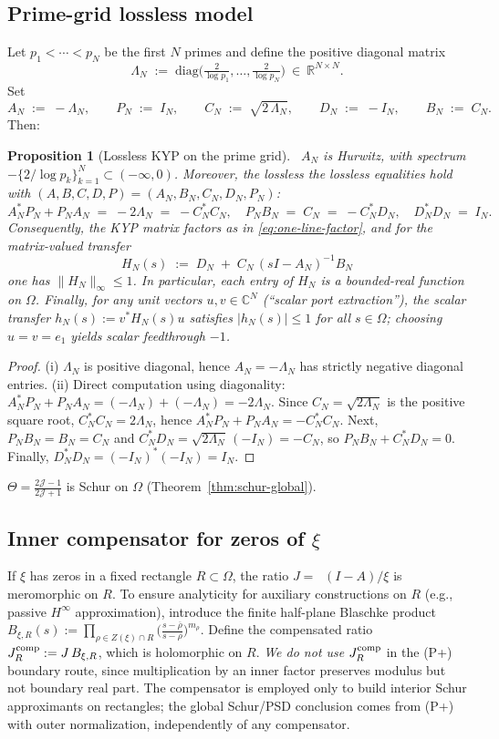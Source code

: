 \documentclass[11pt]{article}
\newtheorem{proposition}[theorem]{Proposition}
\theoremstyle{definition}
\theoremstyle{remark}
\newcommand{\C}{\mathbb{C}}
\newcommand{\R}{\mathbb{R}}
\DeclareMathOperator{\dettwo}{det_2}
\begin{document}
\subsection{Prime-grid lossless model}\label{subsec:prime-grid-KYP}
Let \(p_1<\cdots<p_N\) be the first \(N\) primes and define the positive diagonal matrix
\[
 \Lambda_N\;:=\;\mathrm{diag}\!\Big(\tfrac{2}{\log p_1},\dots,\tfrac{2}{\log p_N}\Big)\ \in\ \R^{N\times N}.
\]
Set
\[
 A_N\;:=\;-\Lambda_N,\qquad P_N\;:=\;I_N,\qquad C_N\;:=\;\sqrt{2\,\Lambda_N},\qquad D_N\;:=\;-I_N,\qquad B_N\;:=\;C_N.
\]
Then:
\begin{proposition}[Lossless KYP on the prime grid]\label{prop:prime-grid-KYP}
\ \(A_N\) is Hurwitz, with spectrum \(-\{2/\log p_k\}_{k=1}^N\subset(-\infty,0)\). Moreover, the lossless the lossless equalities hold with \((A,B,C,D,P)=(A_N,B_N,C_N,D_N,P_N)\):
 \[
  A_N^*P_N+P_NA_N\;=\;-2\Lambda_N\;=\;-C_N^*C_N,\quad P_NB_N\;=\;C_N\;=\;-C_N^*D_N,\quad D_N^*D_N\;=\;I_N.
 \]
Consequently, the KYP matrix factors as in \eqref{eq:one-line-factor}, and for the matrix-valued transfer
 \[
  H_N(s)\;:=\;D_N\; +\; C_N\,(sI-A_N)^{-1} B_N
 \]
one has \(\|H_N\|_\infty\le 1\). In particular, each entry of \(H_N\) is a bounded-real function on \(\Omega\). Finally, for any unit vectors \(u,v\in\C^N\) (``scalar port extraction''), the scalar transfer \(h_N(s):=v^*H_N(s)u\) satisfies \(|h_N(s)|\le 1\) for all \(s\in\Omega\); choosing \(u=v=e_1\) yields scalar feedthrough \(-1\).
\end{proposition}
\begin{proof}
(i) \(\Lambda_N\) is positive diagonal, hence \(A_N=-\Lambda_N\) has strictly negative diagonal entries.
(ii) Direct computation using diagonality: \(A_N^*P_N+P_NA_N=(-\Lambda_N)+(-\Lambda_N)=-2\Lambda_N\). Since \(C_N=\sqrt{2\Lambda_N}\) is the positive square root, \(C_N^*C_N=2\Lambda_N\), hence \(A_N^*P_N+P_NA_N=-C_N^*C_N\). Next, \(P_NB_N=B_N=C_N\) and \(C_N^*D_N=\sqrt{2\Lambda_N}\,(-I_N)=-C_N\), so \(P_NB_N+ C_N^*D_N=0\). Finally, \(D_N^*D_N=(-I_N)^*(-I_N)=I_N\).
\end{proof}

\(\Theta=\frac{2\mathcal J-1}{2\mathcal J+1}\) is Schur on \(\Omega\) (Theorem~\ref{thm:schur-global}).

\subsection{Inner compensator for zeros of \(\xi\)}\label{subsec:bl-compensator}
If \(\xi\) has zeros in a fixed rectangle \(R\subset\Omega\), the ratio \(J=\dettwo(I-A)/\xi\) is meromorphic on \(R\).
To ensure analyticity for auxiliary constructions on \(R\) (e.g., passive \(H^\infty\) approximation), introduce the finite half-plane Blaschke product
\(
 B_{\xi,R}(s):=\prod_{\rho\in Z(\xi)\cap R} \big(\tfrac{s-\overline \rho}{s-\rho}\big)^{m_\rho}.
\)
Define the compensated ratio \(J_R^{\rm comp}:=J\,B_{\xi,R}\), which is holomorphic on \(R\).
\emph{We do not use} \(J_R^{\rm comp}\) in the (P+) boundary route, since multiplication by an inner factor preserves modulus but not boundary real part. The compensator is employed only to build interior Schur approximants on rectangles; the global Schur/PSD conclusion comes from (P+) with outer normalization, independently of any compensator.
\end{document}
